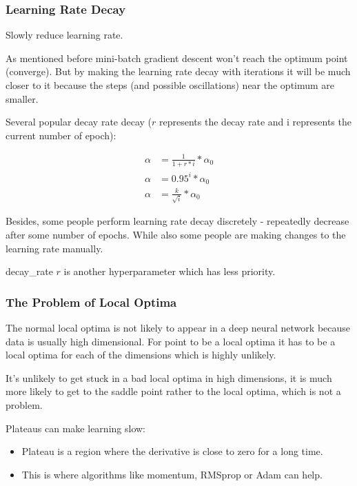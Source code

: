 \subsubsection{Learning Rate Decay}
Slowly reduce learning rate.

As mentioned before mini-batch gradient descent won't reach the optimum point (converge). But by making the learning rate decay with iterations it will be much closer to it because the steps (and possible oscillations) near the optimum are smaller.


Several popular decay rate decay ($r$ represents the decay rate and i represents the current number of epoch):

\begin{equation}
    \begin{aligned}
        \alpha &= \frac{1}{1 + r * i} * \alpha_0\\
        \alpha &= 0.95^i * \alpha_0\\
        \alpha &= \frac{k}{\sqrt{i}} * \alpha_0
    \end{aligned}
\end{equation}

Besides, some people perform learning rate decay discretely - repeatedly decrease after some number of epochs. While also some people are making changes to the learning rate manually.

decay\_rate $r$  is another hyperparameter which has less priority.

\subsubsection{The Problem of Local Optima}
The normal local optima is not likely to appear in a deep neural network because data is usually high dimensional. For point to be a local optima it has to be a local optima for each of the dimensions which is highly unlikely.

It's unlikely to get stuck in a bad local optima in high dimensions, it is much more likely to get to the saddle point rather to the local optima, which is not a problem.

Plateaus can make learning slow:
\begin{itemize}
    \item Plateau is a region where the derivative is close to zero for a long time.
    \item This is where algorithms like momentum, RMSprop or Adam can help.
\end{itemize}


